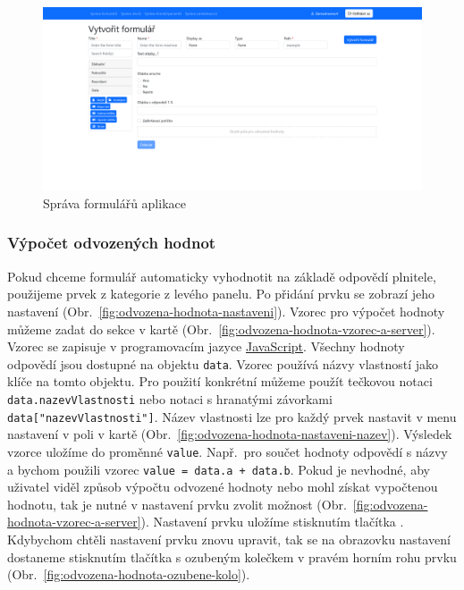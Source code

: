 \begin{figure}[H]
    \includegraphics[width=\textwidth]{../img/screenshots/tvorba-formulare}
    \caption{Správa formulářů aplikace}\label{fig:tvorba-formulare-screenshot}
\end{figure}

\subsubsection{Výpočet odvozených hodnot}\label{subsubsec:vypocet-odvozenych-hodnot}

Pokud chceme formulář automaticky vyhodnotit na základě odpovědí plnitele, použijeme prvek  z kategorie  z levého panelu.
Po přidání prvku se zobrazí jeho nastavení (Obr.~\ref{fig:odvozena-hodnota-nastaveni}).
Vzorec pro výpočet hodnoty můžeme zadat do sekce  v kartě  (Obr.~\ref{fig:odvozena-hodnota-vzorec-a-server}).
Vzorec se zapisuje v programovacím jazyce \href{https://developer.mozilla.org/en-US/docs/Web/JavaScript}{JavaScript}.
Všechny hodnoty odpovědí jsou dostupné na objektu \texttt{data}.
Vzorec používá názvy vlastností jako klíče na tomto objektu.
Pro použití konkrétní můžeme použít tečkovou notaci \texttt{data.nazevVlastnosti} nebo notaci s hranatými závorkami \texttt{data["nazevVlastnosti"]}.
Název vlastnosti lze pro každý prvek nastavit v menu nastavení v poli  v kartě  (Obr.~\ref{fig:odvozena-hodnota-nastaveni-nazev}).
Výsledek vzorce uložíme do proměnné \texttt{value}.
Např.\ pro součet hodnoty odpovědí s názvy  a  bychom použili vzorec \texttt{value = data.a + data.b}.
Pokud je nevhodné, aby uživatel viděl způsob výpočtu odvozené hodnoty nebo mohl získat vypočtenou hodnotu, tak je nutné v nastavení prvku zvolit možnost  (Obr.~\ref{fig:odvozena-hodnota-vzorec-a-server}).
Nastavení prvku uložíme stisknutím tlačítka .
Kdybychom chtěli nastavení prvku znovu upravit, tak se na obrazovku nastavení dostaneme stisknutím tlačítka s ozubeným kolečkem v pravém horním rohu prvku (Obr.~\ref{fig:odvozena-hodnota-ozubene-kolo}).

